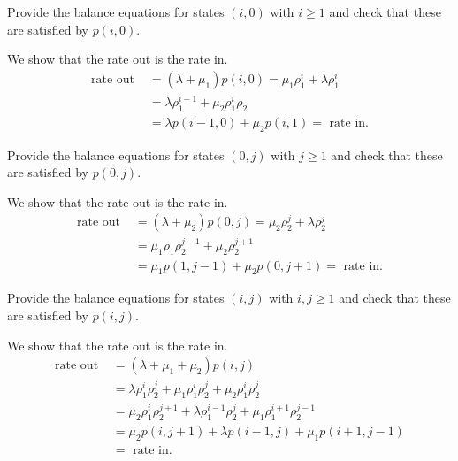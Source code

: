 \documentclass[companion]{subfiles}
\begin{document}
\begin{extra}
  Provide the balance equations for  states $(i,0)$ with $i\geq 1$ and check that these are satisfied by $p(i,0)$. 
\begin{solution} We show that the rate out is the rate in.
  \begin{align*}
    \text{rate out } &=(\lambda + \mu_1) p(i,0) = \mu_1 \rho_1^i + \lambda \rho_1^i \\
                     &= \lambda \rho_1^{i-1} + \mu_2 \rho_1^i \rho_2 \\
    &= \lambda p(i-1,0) + \mu_2 p(i, 1) = \text{ rate in}.
  \end{align*}
\end{solution}
\end{extra}

\begin{extra}
  Provide the balance equations for states $(0,j)$ with $j\geq 1$ and check that these are satisfied by $p(0, j)$. 
\begin{solution} We show that the rate out is the rate in.
  \begin{align*}
    \text{rate out } &=(\lambda + \mu_2) p(0, j) = \mu_2 \rho_2^j + \lambda \rho_2^j\\
                     &= \mu_1\rho_1 \rho_2^{j-1} + \mu_2 \rho_2^{j+1} \\
    &= \mu_1 p(1,j-1) + \mu_2 p(0, j+1) = \text{ rate in}.
  \end{align*}
\end{solution}
\end{extra}

\begin{extra}
  Provide the balance equations for states $(i,j)$ with $i, j\geq 1$ and check that these are satisfied by $p(i, j)$. 
\begin{solution} We show that the rate out is the rate in.
  \begin{align*}
    \text{rate out } &=(\lambda + \mu_1 + \mu_2) p(i, j) \\
    &= \lambda  \rho_1^i \rho_2^j + \mu_1 \rho_1^{i} \rho_2^j + \mu_2 \rho_1^i\rho_2^j\\
    &=\mu_2 \rho_1^{i} \rho_2^{j+1} + \lambda \rho_1^{i-1} \rho_2^j + \mu_1 \rho_1^{i+1}\rho_2^{j-1}\\
                     &= \mu_2p(i, j+1) + \lambda p(i-1, j) + \mu_1 p(i+1, j-1)\\
    &= \text{ rate in}.
  \end{align*}
\end{solution}
\end{extra}
\end{document}
